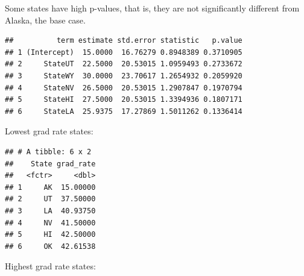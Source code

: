 \documentclass[]{article}
\newenvironment{Shaded}{\begin{snugshade}}{\end{snugshade}}
\newcommand{\KeywordTok}[1]{\textcolor[rgb]{0.13,0.29,0.53}{\textbf{#1}}}
\newcommand{\DataTypeTok}[1]{\textcolor[rgb]{0.13,0.29,0.53}{#1}}
\newcommand{\DecValTok}[1]{\textcolor[rgb]{0.00,0.00,0.81}{#1}}
\newcommand{\StringTok}[1]{\textcolor[rgb]{0.31,0.60,0.02}{#1}}
\newcommand{\OperatorTok}[1]{\textcolor[rgb]{0.81,0.36,0.00}{\textbf{#1}}}
\newcommand{\NormalTok}[1]{#1}
\begin{document}
Some states have high p-values, that is, they are not significantly
different from Alaska, the base case.

\begin{Shaded}
\end{Shaded}

\begin{verbatim}
##          term estimate std.error statistic   p.value
## 1 (Intercept)  15.0000  16.76279 0.8948389 0.3710905
## 2     StateUT  22.5000  20.53015 1.0959493 0.2733672
## 3     StateWY  30.0000  23.70617 1.2654932 0.2059920
## 4     StateNV  26.5000  20.53015 1.2907847 0.1970794
## 5     StateHI  27.5000  20.53015 1.3394936 0.1807171
## 6     StateLA  25.9375  17.27869 1.5011262 0.1336414
\end{verbatim}

Lowest grad rate states:

\begin{Shaded}
\end{Shaded}

\begin{verbatim}
## # A tibble: 6 x 2
##    State grad_rate
##   <fctr>     <dbl>
## 1     AK  15.00000
## 2     UT  37.50000
## 3     LA  40.93750
## 4     NV  41.50000
## 5     HI  42.50000
## 6     OK  42.61538
\end{verbatim}

Highest grad rate states:

\begin{Shaded}
\end{Shaded}
\end{document}

